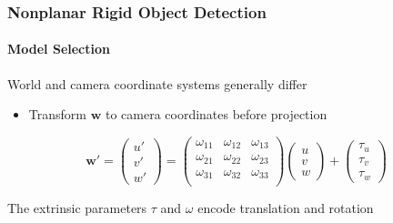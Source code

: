 \documentclass[xetex,professionalfont]{beamer}
\renewcommand{\vec}[1]{\ensuremath{\mathbf{#1}}}
\newcommand{\vw}{\vec{w}}
\renewcommand\emph[1]{\textcolor{tuwcvl_inf_red}{#1}}
\begin{document}
\begin{frame}
\frametitle{Nonplanar Rigid Object Detection}
\framesubtitle{Model Selection}

World and camera coordinate systems generally differ
\begin{itemize}
    \item Transform $\vw$ to camera coordinates before projection
\end{itemize}

\[
    \vw' =
    \begin{pmatrix}
        u' \\ v' \\ w'
    \end{pmatrix} =
    \begin{pmatrix}
        \omega_{11} & \omega_{12} & \omega_{13} \\
        \omega_{21} & \omega_{22} & \omega_{23} \\
        \omega_{31} & \omega_{32} & \omega_{33} \\
    \end{pmatrix}
    \begin{pmatrix}
        u \\ v \\ w
    \end{pmatrix} +
    \begin{pmatrix}
        \tau_u \\ \tau_v \\ \tau_w
    \end{pmatrix}
\]

\medskip
The \emph{extrinsic parameters} $\tau$ and $\omega$ encode translation and rotation

\end{frame}

\end{document}
